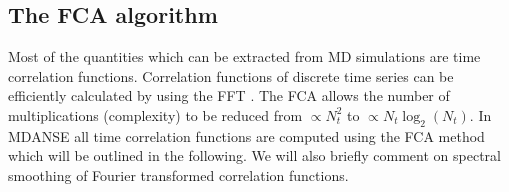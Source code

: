 \documentclass[a4paper,11pt]{article}
\begin{document}
\newpage
\appendix
\appendixpage
\addappheadtotoc
\begin{appendices}
\chapter{The FCA algorithm}
\label{fca}
Most of the quantities which can be extracted from \gls{MD} simulations are time correlation functions. 
Correlation functions of discrete time series can be efficiently calculated by using the \gls{FFT} \cite{Brigham}. The \gls{FCA} allows the number of multiplications (complexity) to be reduced from $\propto N_t^2$ to $\propto N_t \log_2(N_t)$. In 
\gls{MDANSE} all time correlation functions are computed using the \gls{FCA} method which will be outlined in the 
following. We will also briefly comment on spectral smoothing of Fourier transformed correlation functions.


\end{appendices}
\end{document}
